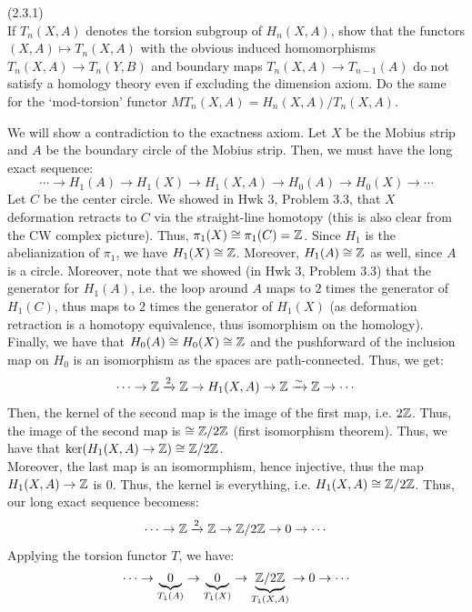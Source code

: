 \documentclass[12pt]{article}
\begin{document}



\begin{problem}{1}(2.3.1) \\
    If $T_n(X,A)$ denotes the torsion subgroup of $H_n(X,A)$, show that the functors $(X,A) \mapsto T_n(X,A)$ with the obvious induced homomorphisms $T_n(X,A) \to T_n(Y,B)$ and boundary maps $T_n(X,A) \to T_{n-1}(A)$ do not satisfy a homology theory even if excluding the dimension axiom. Do the same for the `mod-torsion' functor $MT_n(X,A) = H_n(X,A)/T_n(X,A)$. 
\end{problem}

\begin{solution}
    We will show a contradiction to the exactness axiom. Let $X$ be the Mobius strip and $A$ be the boundary circle of the Mobius strip. Then, we must have the long exact sequence: 
    \[\cdots \to H_1(A) \to H_1(X) \to H_1(X, A) \to H_0(A) \to H_0(X) \to  \cdots \]
    Let $C$ be the center circle. We showed in Hwk 3, Problem 3.3, that $X$ deformation retracts to $C$ via the straight-line homotopy (this is also clear from the CW complex picture). Thus, $\pi_1(X) \cong \pi_1(C) = \mathbb Z$. Since $H_1$ is the abelianization of $\pi_1$, we have $H_1(X) \cong \mathbb Z$. \bbni 
    Moreover, $H_1(A) \cong \mathbb Z$ as well, since $A$ is a circle. Moreover, note that we showed (in Hwk 3, Problem 3.3) that the generator for $H_1(A)$, i.e. the loop around $A$ maps to $2$ times the generator of $H_1(C)$, thus maps to $2$ times the generator of $H_1(X)$ (as deformation retraction is a homotopy equivalence, thus isomorphism on the homology). \bbni
    Finally, we have that $H_0(A) \cong H_0(X) \cong \mathbb Z$ and the pushforward of the inclusion map on $H_0$ is an isomorphism as the spaces are path-connected. Thus, we get: 
    \[\cdots \to \mathbb Z \xrightarrow{2} \mathbb Z \to H_1(X, A) \to \mathbb Z \xrightarrow{\sim} \mathbb Z \to \cdots \]
    Then, the kernel of the second map is the image of the first map, i.e. $2\mathbb Z$. Thus, the image of the second map is $\cong \mathbb Z/2\mathbb Z$ (first isomorphism theorem). Thus, we have that $\ker(H_1(X, A) \to \mathbb Z) \cong \mathbb Z/2\mathbb Z$. \\
    Moreover, the last map is an isomormphism, hence injective, thus the map $H_1(X, A) \to \mathbb Z$ is $0$. Thus, the kernel is everything, i.e. $H_1(X, A) \cong \mathbb Z/2\mathbb Z$. Thus, our long exact sequence becomess:
    \[ \cdots \to \mathbb Z \xrightarrow{2} \mathbb Z \to \mathbb Z/2\mathbb Z \to 0 \to \cdots \]
    Applying the torsion functor $T$, we have: 
    \begin{align*}
        \cdots \to \underbrace{0}_{T_1(A)} \to \underbrace{0}_{T_1(X)} \to \underbrace{\Z/2\Z}_{T_1(X,A)} \to 0 \to \cdots

\end{align*}
\end{solution}
\end{document}
